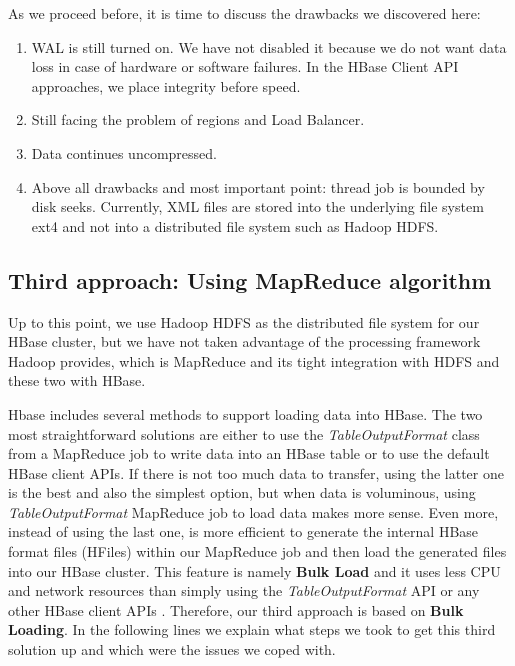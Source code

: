 \bigskip

As we proceed before, it is time to discuss the drawbacks we discovered here:
\begin{enumerate}
\item WAL is still turned on. We have not disabled it because we do not want data loss in case of hardware or software failures. In the HBase Client API approaches, we place integrity before speed.

\item Still facing the problem of regions and Load Balancer.

\item Data continues uncompressed.

\item Above all drawbacks and most important point: thread job is bounded by disk seeks. Currently, XML files are stored into the underlying file system ext4 and not into a distributed file system such as Hadoop HDFS.
\end{enumerate}


\subsection{Third approach: Using MapReduce algorithm}


Up to this point, we use Hadoop HDFS as the distributed file system for our HBase cluster, but we have not taken advantage of the processing framework Hadoop provides, which is MapReduce and its tight integration with HDFS and these two with HBase.
\par
Hbase includes several methods to support loading data into HBase. The two most straightforward solutions are either to use the \textit{TableOutputFormat} class from a MapReduce job to write data into an HBase table or to use the default HBase client APIs. If there is not too much data to transfer, using the latter one is the best and also the simplest option, but when data is voluminous, using \textit{TableOutputFormat} MapReduce job to load data makes more sense. Even more, instead of using the last one, is more efficient to generate the internal HBase format files (HFiles) within our MapReduce job and then load the generated files into our HBase cluster. This feature is namely \textbf{Bulk Load} and it uses less CPU and network resources than simply using the \textit{TableOutputFormat} API or any other HBase client APIs \cite{ApacheHBaseBulkLoad}. Therefore, our third approach is based on \textbf{Bulk Loading}. In the following lines we explain what steps we took to get this third solution up and which were the issues we coped with.

